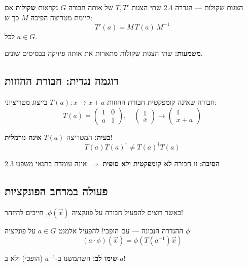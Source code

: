 \begin{definitionbox}{הצגות שקולות — הגדרה 2.4}
שתי הצגות $T, T'$ של אותה חבורה $G$ נקראות \textbf{שקולות} אם קיימת מטריצה הפיכה $M$ כך ש:
\[
T'(a) = M \, T(a) \, M^{-1}
\]
לכל $a \in G$.

\textbf{משמעות:} שתי הצגות שקולות מתארות את אותה פיזיקה בבסיסים שונים.
\end{definitionbox}

\subsection{דוגמה נגדית: חבורת ההזזות}

\begin{examplebox}{חבורה שאינה קומפקטית}
חבורת ההזזות $T(a): x \to x + a$ בייצוג מטריציוני:
\[
T(a) = \begin{pmatrix} 1 & 0 \\ a & 1 \end{pmatrix}, \quad 
\begin{pmatrix} 1 \\ x \end{pmatrix} \to \begin{pmatrix} 1 \\ x+a \end{pmatrix}
\]

\textbf{בעיה:} המטריצה $T(a)$ \textbf{אינה נורמלית}!
\[
T(a) T(a)^\dagger \neq T(a)^\dagger T(a)
\]

\textbf{הסיבה:} זו חבורה \textbf{לא קומפקטית} ו\textbf{לא סופית} $\Rightarrow$ אינה עומדת בתנאי משפט 2.3
\end{examplebox}

\subsection{פעולה במרחב הפונקציות}

כאשר רוצים להפעיל חבורה על פונקציה $\phi(\vec{x})$, חייבים להיזהר!

\begin{definitionbox}{ההגדרה הנכונה — עם הופכי!}
להפעיל אלמנט $a \in G$ על פונקציה $\phi$:
\[
(a \cdot \phi)(\vec{x}) = \phi(T(a^{-1})\vec{x})
\]

\textbf{שימו לב:} השתמשנו ב-$a^{-1}$ (הופכי) ולא ב-$a$!
\end{definitionbox}

